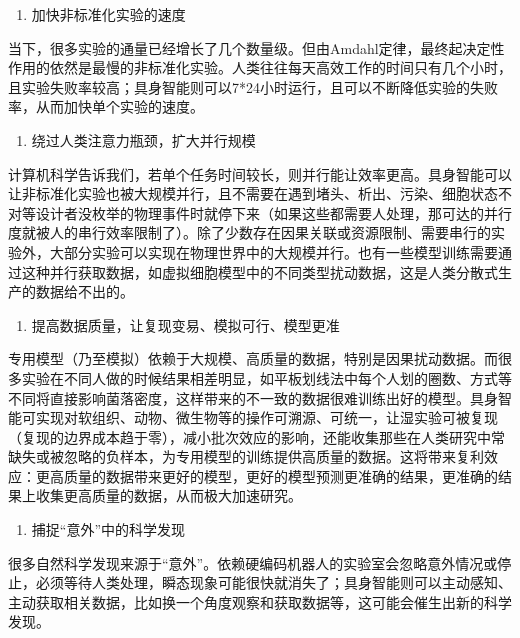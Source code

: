 \begin{enumerate}
\def\labelenumi{\arabic{enumi}.}
\setcounter{enumi}{1}
\tightlist
\item
  加快非标准化实验的速度
\end{enumerate}

当下，很多实验的通量已经增长了几个数量级。但由Amdahl定律，最终起决定性作用的依然是最慢的非标准化实验。人类往往每天高效工作的时间只有几个小时，且实验失败率较高；具身智能则可以7*24小时运行，且可以不断降低实验的失败率，从而加快单个实验的速度。

\begin{enumerate}
\def\labelenumi{\arabic{enumi}.}
\setcounter{enumi}{2}
\tightlist
\item
  绕过人类注意力瓶颈，扩大并行规模
\end{enumerate}

计算机科学告诉我们，若单个任务时间较长，则并行能让效率更高。具身智能可以让非标准化实验也被大规模并行，且不需要在遇到堵头、析出、污染、细胞状态不对等设计者没枚举的物理事件时就停下来（如果这些都需要人处理，那可达的并行度就被人的串行效率限制了）。除了少数存在因果关联或资源限制、需要串行的实验外，大部分实验可以实现在物理世界中的大规模并行。也有一些模型训练需要通过这种并行获取数据，如虚拟细胞模型中的不同类型扰动数据，这是人类分散式生产的数据给不出的。

\begin{enumerate}
\def\labelenumi{\arabic{enumi}.}
\setcounter{enumi}{3}
\tightlist
\item
  提高数据质量，让复现变易、模拟可行、模型更准
\end{enumerate}

专用模型（乃至模拟）依赖于大规模、高质量的数据，特别是因果扰动数据。而很多实验在不同人做的时候结果相差明显，如平板划线法中每个人划的圈数、方式等不同将直接影响菌落密度，这样带来的不一致的数据很难训练出好的模型。具身智能可实现对软组织、动物、微生物等的操作可溯源、可统一，让湿实验可被复现（复现的边界成本趋于零），减小批次效应的影响，还能收集那些在人类研究中常缺失或被忽略的负样本，为专用模型的训练提供高质量的数据。这将带来复利效应：更高质量的数据带来更好的模型，更好的模型预测更准确的结果，更准确的结果上收集更高质量的数据，从而极大加速研究。

\begin{enumerate}
\def\labelenumi{\arabic{enumi}.}
\setcounter{enumi}{4}
\tightlist
\item
  捕捉``意外''中的科学发现
\end{enumerate}

很多自然科学发现来源于``意外''。依赖硬编码机器人的实验室会忽略意外情况或停止，必须等待人类处理，瞬态现象可能很快就消失了；具身智能则可以主动感知、主动获取相关数据，比如换一个角度观察和获取数据等，这可能会催生出新的科学发现。

